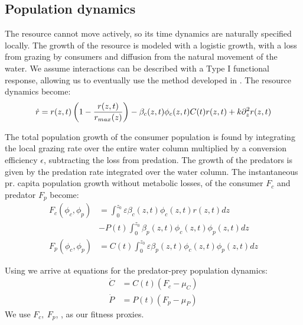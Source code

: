 \subsection{Population dynamics}

The resource cannot move actively, so its time dynamics are naturally specified locally. The growth of the resource is modeled with a logistic growth, with a loss from grazing by consumers and diffusion from the natural movement of the water. We assume interactions can be described with a Type I functional response, allowing us to eventually use the method developed in . The resource dynamics become:
\begin{equation}
  \label{eq:res_dyn}
	\dot{r} = r(z,t)\pa{1-\frac{r(z,t)}{r_{max}(z)}} - \beta_c(z,t)\phi_c(z,t)C(t) r(z,t)  + k \partial_z^2 r(z,t) \\
\end{equation}

The total population growth of the consumer population is found by integrating the local grazing rate over the entire water column multiplied by a conversion efficiency $\epsilon$, subtracting the loss from predation. The growth of the predators is given by the predation rate integrated over the water column. The instantaneous pr. capita population growth without metabolic losses, of the consumer $F_c$ and predator $F_p$  become:
\begin{equation}
  \begin{split}
	F_c(\phi_c, \phi_p) &= \int_0^{z_0} \varepsilon \beta_c(z,t)\phi_c(z,t)r(z,t) dz\\ &- P(t)\int_0^{z_0} \beta_p(z,t) \phi_c(z,t) \phi_p(z,t)dz \\
	F_p(\phi_c, \phi_p) &=  C(t) \int_0^{z_0} \varepsilon \beta_p(z,t)\phi_c(z,t)\phi_p(z,t) dz
  \end{split}
  \label{eq:fitness}
\end{equation}


Using  we arrive at equations for the predator-prey population dynamics:
\begin{equation}
  \begin{split}
	\dot{C} &= C(t)\left ( F_c - \mu_C \right ) \\
	\dot{P} &= P(t) \left ( F_p - \mu_P  \right )
\end{split}
  \label{eq:population_growth_prob_dens}
\end{equation}
We use $F_c,~F_p$, , as our fitness proxies.
